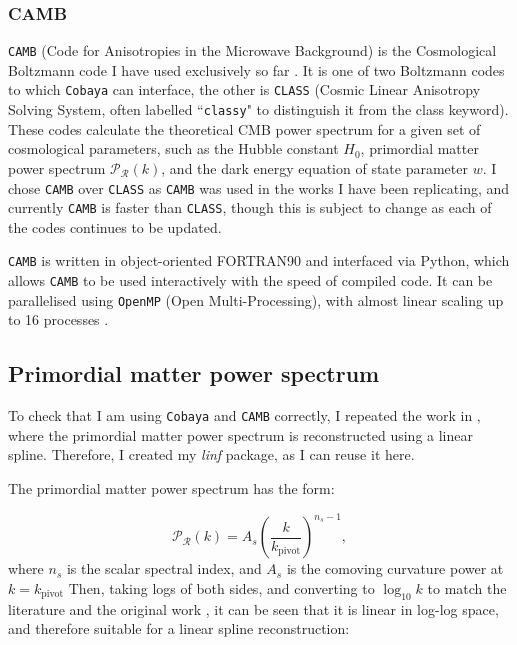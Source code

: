 \documentclass{article}
\begin{document}
\subsubsection{CAMB}
\texttt{CAMB} (Code for Anisotropies in the Microwave Background) is the Cosmological Boltzmann code I have used exclusively so far \cite{CAMB_1, CAMB_2}. It is one of two Boltzmann codes to which \texttt{Cobaya} can interface, the other is \texttt{CLASS} (Cosmic Linear Anisotropy Solving System, often labelled ``\texttt{classy}" to distinguish it from the class keyword). These codes calculate the theoretical CMB power spectrum for a given set of cosmological parameters, such as the Hubble constant $H_0$, primordial matter power spectrum $\mathcal P_\mathcal R(k)$, and the dark energy equation of state parameter $w$. I chose \texttt{CAMB} over \texttt{CLASS} as \texttt{CAMB} was used in the works I have been replicating, and currently \texttt{CAMB} is faster than \texttt{CLASS}, though this is subject to change as each of the codes continues to be updated.

\texttt{CAMB} is written in object-oriented FORTRAN90 and interfaced via Python, which allows \texttt{CAMB} to be used interactively with the speed of compiled code. It can be parallelised using \texttt{OpenMP} (Open Multi-Processing), with almost linear scaling up to 16 processes \cite{camb_mp}. 

\subsection{Primordial matter power spectrum}
To check that I am using \texttt{Cobaya} and \texttt{CAMB} correctly, I repeated the work in \cite{Handley2019}, where the primordial matter power spectrum is reconstructed using a linear spline. Therefore, I created my \textit{linf} package, as I can reuse it here.

The primordial matter power spectrum has the form:

\begin{equation}
  \mathcal P_\mathcal R(k) = A_s \left(\frac{k}{k_\textrm{pivot}} \right) ^ {n_s - 1},
\end{equation}
%
where $n_s$ is the scalar spectral index, and $A_s$ is the comoving curvature power at $k=k_\textrm{pivot}$ Then, taking logs of both sides, and converting to $\log_{10}{k}$ to match the literature and the original work \cite{Handley2019}, it can be seen that it is linear in log-log space, and therefore suitable for a linear spline reconstruction:
\end{document}
